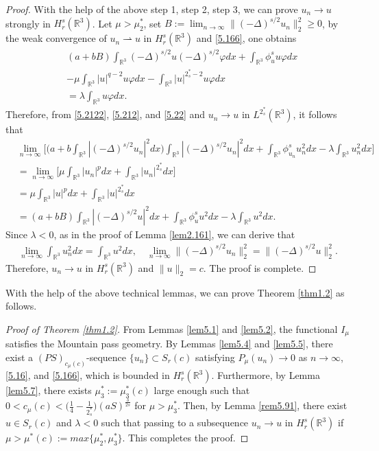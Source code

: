 \documentclass[reqno]{amsart}
\begin{document}
\begin{proof}
With the help  of  the above step 1, step 2, step 3, we can prove $u_n\to u$ 
strongly in $H^s_r(\mathbb{R}^3)$. Let $\mu>\mu^*_2$, set 
$B:=\lim_{n\to\infty} \|(-\Delta)^{s/2}u_n\|^2_2\geq 0 $, by the weak convergence of 
$u_n\rightharpoonup u$ in  $H^s_r(\mathbb{R}^3)$ and  \eqref{5.166}, one obtains
\begin{equation}\label{5.22}
\begin{split}
&(a+bB)\int_{\mathbb{R}^3}(-\Delta)^{s/2}u(-\Delta)^{s/2}\varphi dx
 +\int_{\mathbb{R}^3}\phi^s_{u}u\varphi dx\\
&-\mu \int_{\mathbb{R}^3}|u|^{q-2}u\varphi dx
 -\int_{\mathbb{R}^3}|u|^{2^*_s-2}u\varphi dx \\
&=\lambda \int_{\mathbb{R}^3} u\varphi dx.
\end{split}
\end{equation}
Therefore, from \eqref{5.2122}, \eqref{5.212}, and \eqref{5.22} and 
$u_n\to u$ in $L^{2^*_s}(\mathbb{R}^3)$, it follows that
\begin{align*} %
&\lim_{n\to\infty}\Big[\Big(a+b\int_{\mathbb{R}^3}|(-\Delta)^{s/2}u_n|^2dx\Big)
 \int_{\mathbb{R}^3}|(-\Delta)^{s/2}u_n|^2 dx
 +\int_{\mathbb{R}^3}\phi^s_{u_n}{u^2_n}dx
 -\lambda \int_{\mathbb{R}^3} {u^2_n} dx\Big]\\
&=\lim_{n\to\infty}\Big [\mu \int_{\mathbb{R}^3}|u_n|^{p}dx
 +\int_{\mathbb{R}^3}|u_n|^{2^*_s} dx\Big]\\
&=\mu \int_{\mathbb{R}^3}|u|^{p}dx+\int_{\mathbb{R}^3}|u|^{2^*_s} dx\\
&=(a+bB)\int_{\mathbb{R}^3}|(-\Delta)^{s/2}u|^2 dx
 +\int_{\mathbb{R}^3}\phi^s_{u}{u^2}dx
 -\lambda \int_{\mathbb{R}^3} {u^2} dx.
\end{align*}
Since $\lambda<0$, as in the proof of Lemma {\ref{lem2.161}},  
we can derive that
\begin{align*} %
\lim_{n\to\infty} \int_{\mathbb{R}^3} {u^2_n} dx
= \int_{\mathbb{R}^3} {u^2} dx,\quad
\lim_{n\to\infty}  \|(-\Delta)^{s/2}u_n\|^2_2 = \|(-\Delta)^{s/2}u\|^2_2.
\end{align*}
Therefore, $u_n\to u$ in $H^s_{r}(\mathbb{R}^3)$ and $\|u\|_2=c$. 
The proof is complete.
\end{proof}

With the help of the above technical lemmas, we can prove Theorem \ref{thm1.2} 
as follows.

\begin{proof}[Proof of Theorem \ref{thm1.2}]
From Lemmas \ref{lem5.1} and \ref{lem5.2}, the functional $I_\mu$ satisfies 
the Mountain pass geometry. By Lemmas \ref{lem5.4} and \ref{lem5.5}, there exist 
a $(PS)_{c_\mu(c)}$-sequence $\{u_n\}\subset S_{r}(c)$ satisfying  
$P_\mu(u_n)\to 0$ as $n\to \infty$, \eqref{5.16}, and \eqref{5.166}, 
which is bounded in $H^s_r(\mathbb{R}^3)$. 
Furthermore, by Lemma \ref{lem5.7}, there exists $\mu^*_3:=\mu^*_3(c)$ large enough 
such that $0<c_\mu(c)<\Big(\frac{1}{4}-\frac{1}{2^*_s}\Big)(aS)^{\frac{3}{2s}}$ 
for $\mu>\mu^*_3$. Then, by Lemma \ref{rem5.91}, there exist 
$u\in S_r(c)$ and $\lambda<0$ such that passing to a subsequence $u_n\to u$ in 
$H^s_r(\mathbb{R}^3)$ if   $\mu>\mu^*(c):=max\{\mu^*_2, \mu^*_3\}$. 
This completes the proof.
\end{proof}
\end{document}
